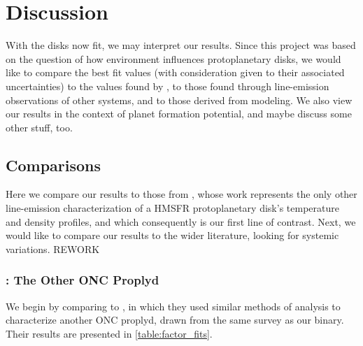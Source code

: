 \chapter{Discussion}
\label{chap:discussion}

With the disks now fit, we may interpret our results. Since this project was based on the question of how environment influences protoplanetary disks, we would like to compare the best fit values (with consideration given to their associated uncertainties) to the values found by \citet{Factor2017}, to those found through line-emission observations of other systems, and to those derived from modeling. We also view our results in the context of planet formation potential, and maybe discuss some other stuff, too.

\section{Comparisons}

Here we compare our results to those from \citet{Factor2017}, whose work represents the only other line-emission characterization of a HMSFR protoplanetary disk's temperature and density profiles, and which consequently is our first line of contrast. Next, we would like to compare our results to the wider literature, looking for systemic variations. REWORK

%
\subsection{\citet{Factor2017}: The Other ONC Proplyd}
We begin by comparing to \citet{Factor2017}, in which they used similar methods of analysis to characterize another ONC proplyd, drawn from the same survey as our binary. Their results are presented in \ref{table:factor_fits}.


